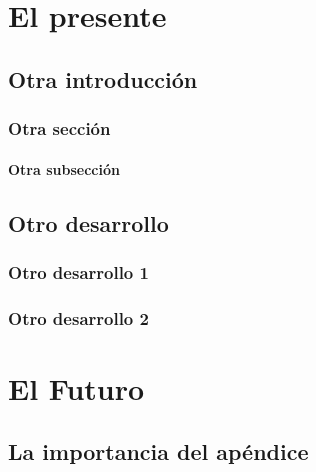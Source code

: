 \documentclass[12pt,c5paper,oneside]{book} %
\begin{document}
\lipsum[2-4]

\clearpage{\pagestyle{empty}\cleardoublepage}

\part{El presente}

\chapter{Otra introducción}

\lipsum[1-4]

\section{Otra sección}

\lipsum[1-3]

\subsection{Otra subsección}

\lipsum[4-6]

\clearpage{\pagestyle{empty}\cleardoublepage}

\chapter{Otro desarrollo}

\lipsum[1-4]

\section{Otro desarrollo 1}

\lipsum[1-2]

\section{Otro desarrollo 2}

\lipsum[2-4]

\clearpage{\pagestyle{empty}\cleardoublepage}

\part{El Futuro}

\appendix

\chapter{La importancia del apéndice}
\end{document}
